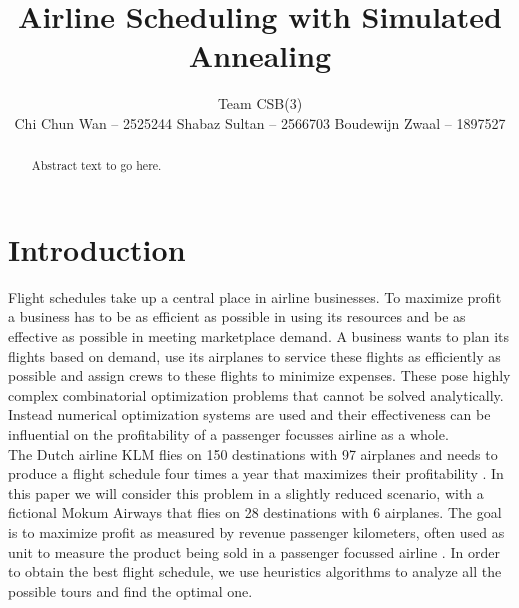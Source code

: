 \documentclass[journal]{IEEEtran}
\author{Team CSB(3)\\Chi Chun Wan -- 2525244 \hspace{0.1\textwidth} Shabaz Sultan -- 2566703 \hspace{0.1\textwidth} Boudewijn Zwaal -- 1897527}
\title{Airline Scheduling with Simulated Annealing}
\begin{document}
\maketitle



\begin{abstract}
Abstract text to go here.
\end{abstract}


\section{Introduction}
Flight schedules take up a central place in airline businesses. To maximize profit a business has to be as efficient as possible in using its resources and be as effective as possible in meeting marketplace demand. A business wants to plan its flights based on demand, use its airplanes to service these flights as efficiently as possible and assign crews to these flights to minimize expenses. These pose highly complex combinatorial optimization problems that cannot be solved analytically. Instead numerical optimization systems are used and their effectiveness can be influential on the profitability of a passenger focusses airline as a whole.\\
The Dutch airline KLM flies on 150 destinations with 97 airplanes and needs to produce a flight schedule four times a year that maximizes their profitability \cite{Bian2003}. In this paper we will consider this problem in a slightly reduced scenario, with a fictional Mokum Airways that flies on 28 destinations with 6 airplanes. The goal is to maximize profit as measured by revenue passenger kilometers, often used as unit to measure the product being sold in a passenger focussed airline \cite{Schefczyk1993}. In order to obtain the best flight schedule, we use heuristics algorithms to analyze all the possible tours and find the optimal one.\\
\end{document}
